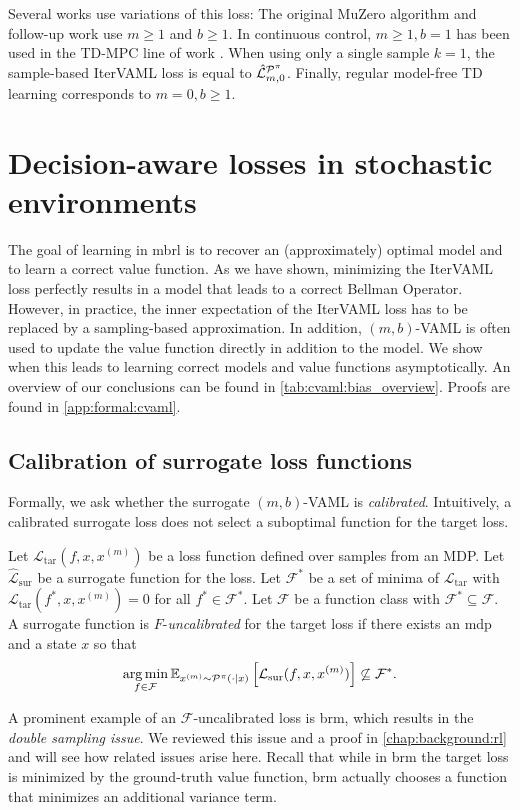 Several works use variations of this loss:
The original MuZero algorithm \parencite{schrittwieser2020mastering} and follow-up work \parencite{ye2021mastering,antonoglou2022planning} use $m\geq1$ and $b\geq1$.
In continuous control, $m\geq1,b=1$ has been used in the TD-MPC line of work \parencite{hansen2022temporal,hansen2024tdmpc}.
When using only a single sample $k=1$, the sample-based IterVAML loss is equal to $\hat{\mathcal{L}}^{\P^\pi}_{m,0}$.
Finally, regular model-free TD learning corresponds to $m=0,b\geq1$.


\section{Decision-aware losses in stochastic environments}
\label{sec:cvaml:theory_1}
The goal of learning in \ac{mbrl} is to recover an (approximately) optimal model and to learn a correct value function.
As we have shown, minimizing the IterVAML loss perfectly results in a model that leads to a correct Bellman Operator.
However, in practice, the inner expectation of the IterVAML loss has to be replaced by a sampling-based approximation.
In addition, $(m,b)$-VAML is often used to update the value function directly in addition to the model.
We show when this leads to learning correct models and value functions asymptotically.
An overview of our conclusions can be found in \autoref{tab:cvaml:bias_overview}.
Proofs are found in \autoref{app:formal:cvaml}.
\subsection{Calibration of surrogate loss functions}

Formally, we ask whether the surrogate $(m,b)$-VAML is \emph{calibrated}.
Intuitively, a calibrated surrogate loss does not select a suboptimal function for the target loss.
\begin{definition}
    Let $\mathcal{L}_\mathrm{tar}(f,x,x^{(m)})$ be a loss function defined over samples from an MDP.
    Let $\hat{\mathcal{L}}_\mathrm{sur}$ be a surrogate function for the loss.
    Let $\mathcal{F}^*$ be a set of minima of $\mathcal{L}_\mathrm{tar}$ with $\mathcal{L}_\mathrm{tar}(f^*,x,x^{(m)}) = 0$ for all $f^* \in \mathcal{F}^*.$
    Let $\mathcal{F}$ be a function class with $\mathcal{F}^* \subseteq \mathcal{F}$.
    A surrogate function is $F$-\emph{uncalibrated} for the target loss if there exists an \ac{mdp}   and a state $x$ so that 
    $$\argmin_{f \in \mathcal{F}} \mathbb{E}_{x^{(m)}\sim\P^\pi(\cdot|x)}\left[\mathcal{L}_\mathrm{sur}(f,x,x^{(m)})\right] \not\subseteq \mathcal{F}^*.$$
\end{definition}
A prominent example of an $\mathcal{F}$-uncalibrated loss is \ac{brm}, which results in the \emph{double sampling issue}.
We reviewed this issue and a proof in \autoref{chap:background:rl} and will see how related issues arise here.
Recall that while in \ac{brm} the target loss is minimized by the ground-truth value function, \ac{brm} actually chooses a function that minimizes an additional variance term.

